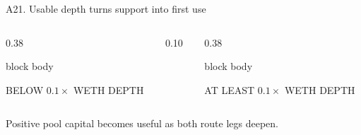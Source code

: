\begin{frame}{A21. Usable depth turns support into first use}
\vspace{0.34cm}
\begin{columns}[T,totalwidth=0.86\textwidth]
\begin{column}{0.38\textwidth}
\begin{beamercolorbox}[rounded=true,sep=0.40cm,wd=\textwidth]{block body}
{\small\color{muted} BELOW $0.1\times$ WETH DEPTH\par}\vspace{0.12cm}
{\fontsize{30}{32}\selectfont\bfseries\color{accent}\BridgeTimingShallowMonthShare\par}
\end{beamercolorbox}
\end{column}
\begin{column}{0.10\textwidth}\centering\vspace{0.70cm}{\Large$\rightarrow$}\end{column}
\begin{column}{0.38\textwidth}
\begin{beamercolorbox}[rounded=true,sep=0.40cm,wd=\textwidth]{block body}
{\small\color{muted} AT LEAST $0.1\times$ WETH DEPTH\par}\vspace{0.12cm}
{\fontsize{30}{32}\selectfont\bfseries\color{stable}\BridgeTimingCompetitiveMonthShare\par}
\end{beamercolorbox}
\end{column}
\end{columns}
\vspace{0.48cm}
{\large Positive pool capital becomes useful as both route legs deepen.\par}
\end{frame}

